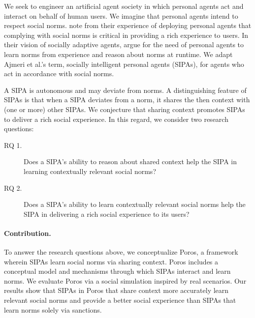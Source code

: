\documentclass[11pt,          %
               phd,           %
               onehalfspacing %
               ]{ncsuthesis}
\makeatletter
\newcommand{\etal}{{et al.\@\xspace}}
\newcommand{\frameworkB}{Poros\xspace}
\newcommand{\nsa}[1]{\textcolor{green!50!black}{NSA:~~#1}}
\newcommand{\mps}[1]{\textcolor{blue}{MPS:~~#1}}
\newcommand{\hg}[1]{\textcolor{blue!50!black}{HG:~~#1}}
\makeatother
\begin{document}
We seek to engineer an artificial agent society in which personal agents
\citep{Murukannaiah-AAMAS14-Xipho} act and interact on behalf of human
users. We imagine that personal agents intend to respect social norms.
\citet{tambe2008electric} note from their experience
of deploying personal agents that complying with social norms is
critical in providing a rich experience to users. In their vision of
socially adaptive agents, 
 argue for the need of personal
agents to learn norms from experience and reason about norms at runtime.
We adapt Ajmeri {\etal}'s \citeyearpar{Ajmeri-AAMAS17-Arnor} term,
socially intelligent personal agents (SIPAs), for agents who act in accordance
with social norms.

A SIPA is autonomous and may deviate from norms. A distinguishing
feature of SIPAs is that when a SIPA deviates from a norm, it shares the
then context with (one or more) other
SIPAs. We conjecture that sharing context promotes SIPAs to deliver a
rich social experience. In this regard, we consider two research
questions:

\begin{description}
\item[RQ 1.] Does a SIPA's ability to reason about shared context 
  help the SIPA in learning contextually relevant social norms? 


\item[RQ 2.] Does a SIPA's ability to learn contextually relevant
  social norms help the SIPA in delivering a rich social experience to
  its users? 
\end{description}

\paragraph{Contribution.}
To answer the research questions above, we conceptualize \frameworkB, a
framework wherein SIPAs learn social norms via sharing context.
\frameworkB includes a conceptual model and mechanisms through which
SIPAs interact and learn norms. We evaluate \frameworkB via
a social simulation inspired by real scenarios. Our results show that SIPAs in \frameworkB that
share context more accurately learn relevant social norms and provide a
better social experience than SIPAs that learn norms solely via
sanctions.
\end{document}

